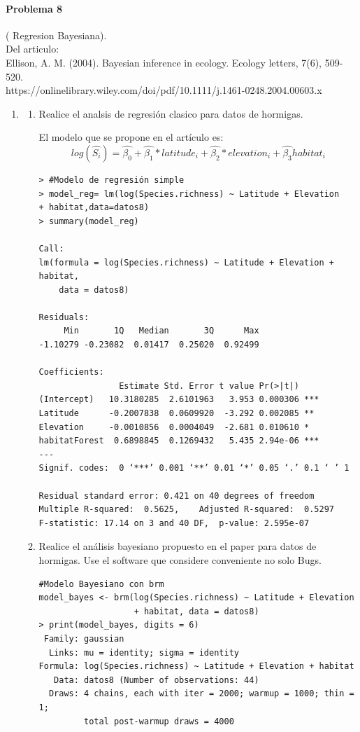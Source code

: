 \documentclass[12pt,a4paper]{report}
\begin{document}
\paragraph{Problema 8 } ( Regresion Bayesiana).
\\
Del articulo:\\

Ellison, A. M. (2004). Bayesian inference in ecology. Ecology letters, 7(6), 509-520.\\

https://onlinelibrary.wiley.com/doi/pdf/10.1111/j.1461-0248.2004.00603.x\\
\begin{enumerate}
\item 
\begin{enumerate}
\item Realice el analsis de regresión clasico para datos de hormigas.

El modelo que se propone en el artículo es: $$log(\hat{S_{i}})=\hat{\beta_{0}}+\hat{\beta_{1}}*latitude_{i}+\hat{\beta_{2}}*elevation_{i}+\hat{\beta_{3}}habitat_{i}$$
\begin{verbatim}
> #Modelo de regresión simple
> model_reg= lm(log(Species.richness) ~ Latitude + Elevation 
+ habitat,data=datos8)
> summary(model_reg)

Call:
lm(formula = log(Species.richness) ~ Latitude + Elevation + habitat, 
    data = datos8)

Residuals:
     Min       1Q   Median       3Q      Max 
-1.10279 -0.23082  0.01417  0.25020  0.92499 

Coefficients:
                Estimate Std. Error t value Pr(>|t|)    
(Intercept)   10.3180285  2.6101963   3.953 0.000306 ***
Latitude      -0.2007838  0.0609920  -3.292 0.002085 ** 
Elevation     -0.0010856  0.0004049  -2.681 0.010610 *  
habitatForest  0.6898845  0.1269432   5.435 2.94e-06 ***
---
Signif. codes:  0 ‘***’ 0.001 ‘**’ 0.01 ‘*’ 0.05 ‘.’ 0.1 ‘ ’ 1

Residual standard error: 0.421 on 40 degrees of freedom
Multiple R-squared:  0.5625,	Adjusted R-squared:  0.5297 
F-statistic: 17.14 on 3 and 40 DF,  p-value: 2.595e-07

\end{verbatim}
\item Realice el análisis bayesiano propuesto en el paper para datos de hormigas. Use el software que considere conveniente no solo Bugs.

\begin{verbatim}
#Modelo Bayesiano con brm
model_bayes <- brm(log(Species.richness) ~ Latitude + Elevation 
                   + habitat, data = datos8)
> print(model_bayes, digits = 6)
 Family: gaussian 
  Links: mu = identity; sigma = identity 
Formula: log(Species.richness) ~ Latitude + Elevation + habitat 
   Data: datos8 (Number of observations: 44) 
  Draws: 4 chains, each with iter = 2000; warmup = 1000; thin = 1;
         total post-warmup draws = 4000


\end{verbatim}
\end{enumerate}
\end{enumerate}
\end{document}
